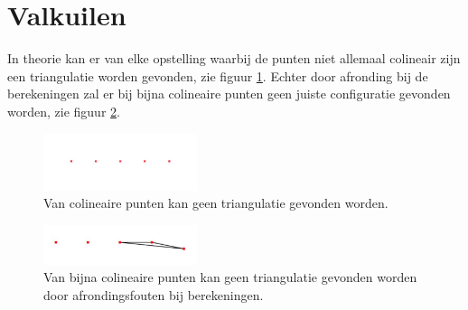 \section{Valkuilen}
In theorie kan er van elke opstelling waarbij de punten niet allemaal colineair zijn een triangulatie worden gevonden, zie figuur \ref{colineair}. Echter door afronding bij de berekeningen zal er bij bijna colineaire punten geen juiste  configuratie gevonden worden, zie figuur \ref{almost_colineair}. 

\begin{figure}
	\center
	\includegraphics[width=0.4\textwidth]{colineair}
	\caption{Van colineaire punten kan geen triangulatie gevonden worden.}
	\label{colineair}
\end{figure}
\begin{figure}
	\center
	\includegraphics[width=0.4\textwidth]{almost_colinair}
	\caption{Van bijna colineaire punten kan geen triangulatie gevonden worden door afrondingsfouten bij berekeningen.}
	\label{almost_colineair}
\end{figure}
